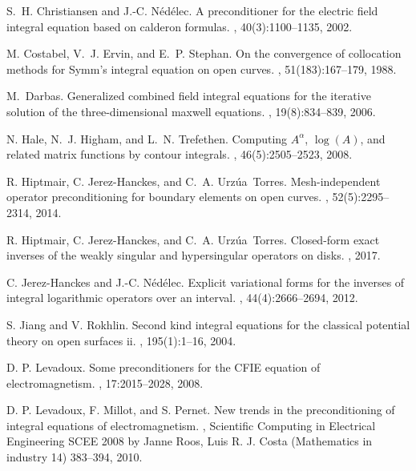 \documentclass[a4paper]{article}
\begin{document}
\begin{thebibliography}{10}
S.~H. Christiansen and J.-C. N{\'e}d{\'e}lec.
\newblock A preconditioner for the electric field integral equation based on
  calderon formulas.
, 40(3):1100--1135, 2002.

M. Costabel, V.~J. Ervin, and E.~P. Stephan.
\newblock On the convergence of collocation methods for Symm's integral
  equation on open curves.
, 51(183):167--179, 1988.

M.~Darbas.
\newblock Generalized combined field integral equations for the iterative
  solution of the three-dimensional maxwell equations.
, 19(8):834--839, 2006.

N. Hale, N.~J. Higham, and L.~N. Trefethen.
\newblock Computing $A^{\alpha}$, $\log(A)$, and related matrix
  functions by contour integrals.
, 46(5):2505--2523, 2008.

R. Hiptmair, C. Jerez-Hanckes, and C.~A. Urz{\'u}a~Torres.
\newblock Mesh-independent operator preconditioning for boundary elements on
  open curves.
, 52(5):2295--2314, 2014.

R. Hiptmair, C. Jerez-Hanckes, and C.~A. Urz{\'u}a~Torres.
\newblock Closed-form exact inverses of the weakly singular and hypersingular
  operators on disks.
, 2017.

C. Jerez-Hanckes and J.-C. N{\'e}d{\'e}lec.
\newblock Explicit variational forms for the inverses of integral logarithmic
  operators over an interval.
, 44(4):2666--2694, 2012.

S. Jiang and V. Rokhlin.
\newblock Second kind integral equations for the classical potential theory on
  open surfaces ii.
, 195(1):1--16, 2004.

{D. P.} Levadoux.
\newblock Some preconditioners for the {CFIE} equation of electromagnetism.
, 17:2015--2028, 2008.

{D. P.} Levadoux, {F.} Millot, and {S.} Pernet.
\newblock New trends in the preconditioning of integral equations of electromagnetism.
, Scientific Computing in Electrical Engineering SCEE 2008 by Janne Roos, Luis R. J. Costa
(Mathematics in industry 14) 383--394, 2010.


\end{thebibliography}
\end{document}
